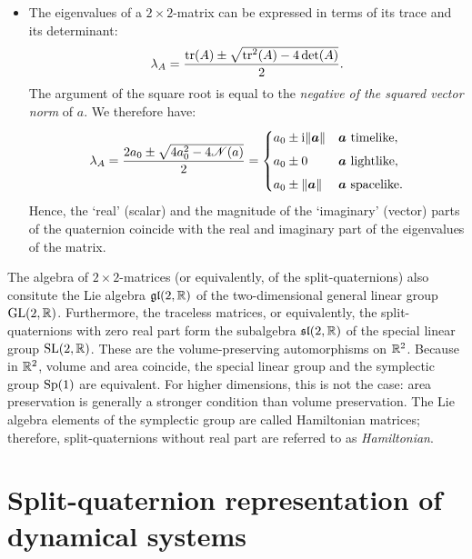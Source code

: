 \begin{itemize}
    \item The eigenvalues of a $2\times2$-matrix can be expressed in terms of its trace and its determinant:
        $$ \lambda_A = \frac{\trace(A) \pm \sqrt{\trace^2(A) - 4\det(A)}}{2}.$$
        The argument of the square root is equal to the \emph{negative of the squared vector norm} of $a$. We therefore have:
        \begin{equation}
            \lambda_A = \frac{2a_0 \pm \sqrt{4 a_0^2 - 4\mathscr{N}(a)}}{2} = 
            \begin{cases}
                a_0 \pm \ii\norm{\vec{a}} & \vec{a} \text{ timelike},\\[1ex]
                a_0 \pm 0  & \vec{a} \text{ lightlike},\\[1ex]
                a_0 \pm \norm{\vec{a}} & \vec{a} \text{ spacelike}.\\
            \end{cases}
            \label{eq:quat_eigvals}
        \end{equation}
        Hence, the `real' (scalar) and the magnitude of the `imaginary' (vector) parts of the quaternion coincide with the real and imaginary part of the eigenvalues of the matrix.
\end{itemize}

The algebra of $2\times2$-matrices (or equivalently, of the split-quaternions) also consitute the Lie algebra $\mathfrak{gl}(2, \mathbb{R})$ of the two-dimensional general linear group $\mathrm{GL}(2, \mathbb{R})$. Furthermore, the traceless matrices, or equivalently, the split-quaternions with zero real part form the subalgebra $\mathfrak{sl}(2, \mathbb{R})$ of the special linear group $\mathrm{SL}(2, \mathbb{R})$. These are the volume-preserving automorphisms on $\mathbb{R}^2$. Because in $\mathbb{R}^2$, volume and area coincide, the special linear group and the symplectic group $\mathrm{Sp}(1)$ are equivalent. For higher dimensions, this is not the case: area preservation is generally a stronger condition than volume preservation. The Lie algebra elements of the symplectic group are called Hamiltonian matrices; therefore, split-quaternions without real part are referred to as \emph{Hamiltonian}.

\section{Split-quaternion representation of dynamical systems}
\label{sec:system_classification}
